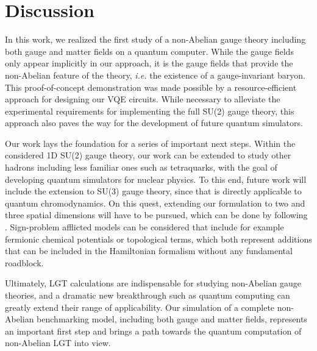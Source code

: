 \documentclass[twocolumn,aps,showpacs,prb,superscriptaddress,floatfix,10pt,nofootinbib]{revtex4-2}
\begin{document}
\section*{Discussion}

In this work, we realized the first study of a non-Abelian gauge theory including both gauge and matter fields on a quantum computer. While the gauge fields only appear implicitly in our approach, it is the gauge fields that provide the non-Abelian feature of the theory, \textit{i.e.} the existence of a gauge-invariant baryon. This proof-of-concept demonstration was made possible by a resource-efficient approach for designing our VQE circuits. While necessary to alleviate the experimental requirements for implementing the full SU(2) gauge theory, this approach also paves the way for the development of future quantum simulators.

Our work lays the foundation for a series of important next steps. Within the considered 1D SU(2)
gauge theory, our work can be extended to study other hadrons including less familiar ones such
as tetraquarks, with the goal of developing quantum simulators for nuclear physics. To this end, future
work will include the extension to SU(3) gauge theory, since that is directly applicable to
quantum chromodynamics. On this quest, extending our formulation to two and three spatial
dimensions will have to be pursued, which can be done by following \cite{haase_resource_2021}. Sign-problem afflicted
models can be considered that include for example fermionic chemical potentials or topological
terms, which both represent additions that can be included in the Hamiltonian formalism without any
fundamental roadblock.

Ultimately, LGT calculations are indispensable for studying non-Abelian gauge theories, and a dramatic new breakthrough such as quantum computing can greatly extend their range of applicability. Our simulation of a complete non-Abelian benchmarking model, including both gauge and matter fields, represents an important first step and brings a path towards the quantum computation of non-Abelian LGT into view.
\end{document}
